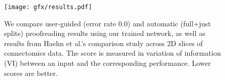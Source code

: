 \begin{figure}[t]
\centering
\texttt{[image: gfx/results.pdf]}
\caption{We compare user-guided (error rate 0.0) and automatic (full+just splits) proofreading results using our trained network,  as well as results from Haehn et al.'s comparison study \cite{haehn_dojo_2014} across 2D slices of connectomics data. The score is measured in variation of information (VI) between an input and the corresponding performance. Lower scores are better.}
\label{fig:results}
\end{figure}
%
%
%
%
%
%
%
%
%
%

